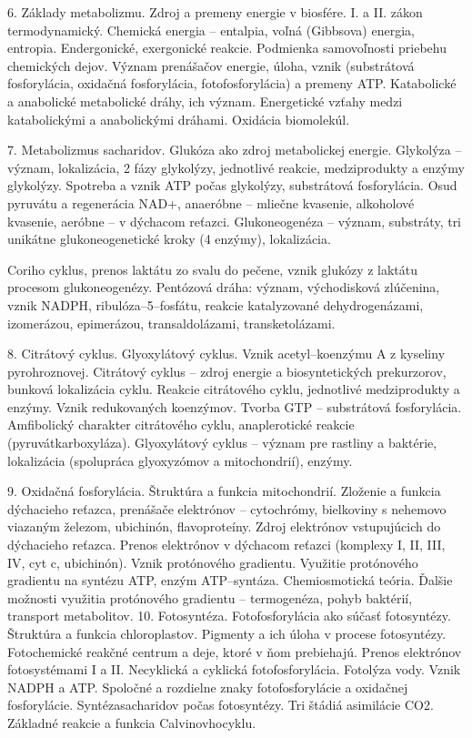 6. Základy metabolizmu. Zdroj a premeny energie v biosfére. I. a II. zákon termodynamický. Chemická energia -- entalpia, voľná (Gibbsova) energia, entropia. Endergonické, exergonické reakcie. Podmienka samovoľnosti priebehu chemických dejov. Význam prenášačov energie, úloha, vznik (substrátová fosforylácia, oxidačná fosforylácia, fotofosforylácia) a premeny ATP. Katabolické a anabolické metabolické dráhy, ich význam. Energetické vzťahy medzi katabolickými a anabolickými dráhami. Oxidácia biomolekúl.

7. Metabolizmus sacharidov. Glukóza ako zdroj metabolickej energie. Glykolýza -- význam, lokalizácia, 2 fázy glykolýzy, jednotlivé reakcie, medziprodukty a enzýmy glykolýzy. Spotreba a vznik ATP počas glykolýzy, substrátová fosforylácia. Osud pyruvátu a regenerácia NAD+, anaeróbne -- mliečne kvasenie, alkoholové kvasenie, aeróbne -- v dýchacom reťazci. Glukoneogenéza -- význam, substráty, tri unikátne glukoneogenetické kroky (4 enzýmy), lokalizácia. 

Coriho cyklus, prenos laktátu zo svalu do pečene, vznik glukózy z laktátu procesom
glukoneogenézy. Pentózová dráha: význam, východisková zlúčenina, vznik NADPH,
ribulóza--5--fosfátu, reakcie katalyzované dehydrogenázami, izomerázou, epimerázou,
transaldolázami, transketolázami.

8. Citrátový cyklus. Glyoxylátový cyklus. Vznik acetyl--koenzýmu A z kyseliny pyrohroznovej.
Citrátový cyklus -- zdroj energie a biosyntetických prekurzorov, bunková lokalizácia cyklu. Reakcie
citrátového cyklu, jednotlivé medziprodukty a enzýmy. Vznik redukovaných koenzýmov. Tvorba
GTP -- substrátová fosforylácia. Amfibolický charakter citrátového cyklu, anaplerotické reakcie
(pyruvátkarboxyláza). Glyoxylátový cyklus -- význam pre rastliny a baktérie, lokalizácia (spolupráca
glyoxyzómov a mitochondrií), enzýmy.

9. Oxidačná fosforylácia. Štruktúra a funkcia mitochondrií. Zloženie a funkcia dýchacieho reťazca,
prenášače elektrónov -- cytochrómy, bielkoviny s nehemovo viazaným železom, ubichinón,
flavoproteíny. Zdroj elektrónov vstupujúcich do dýchacieho reťazca. Prenos elektrónov v dýchacom
reťazci (komplexy I, II, III, IV, cyt c, ubichinón). Vznik protónového gradientu. Využitie protónového
gradientu na syntézu ATP, enzým ATP--syntáza. Chemiosmotická teória. Ďalšie možnosti využitia
protónového gradientu -- termogenéza, pohyb baktérií, transport metabolitov.
10. Fotosyntéza. Fotofosforylácia ako súčasť fotosyntézy. Štruktúra a funkcia chloroplastov. Pigmenty a ich úloha v procese fotosyntézy. Fotochemické reakčné centrum a deje, ktoré v ňom prebiehajú.
Prenos elektrónov fotosystémami I a II. Necyklická a cyklická fotofosforylácia. Fotolýza vody. Vznik NADPH a ATP. Spoločné a rozdielne znaky fotofosforylácie a oxidačnej fosforylácie. Syntézasacharidov počas fotosyntézy. Tri štádiá asimilácie CO2. Základné reakcie a funkcia Calvinovhocyklu.

